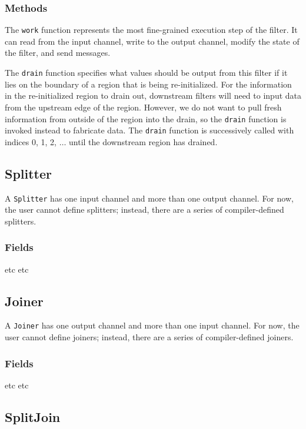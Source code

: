 \subsubsection{Methods}

  The {\tt work} function represents the most
fine-grained execution step of the filter.  It can read from the input
channel, write to the output channel, modify the state of the filter,
and send messages.

  The {\tt drain} function
specifies what values should be output from this filter if it lies on
the boundary of a region that is being re-initialized.  For the
information in the re-initialized region to drain out, downstream
filters will need to input data from the upstream edge of the region.
However, we do not want to pull fresh information from outside of the
region into the drain, so the {\tt drain} function is invoked instead
to fabricate data.  The {\tt drain} function is successively called
with indices 0, 1, 2, $\dots$ until the downstream region has drained.

\subsection{Splitter}

A {\tt Splitter} has one input channel and more than one output
channel.  For now, the user cannot define splitters; instead, there
are a series of compiler-defined splitters.

\subsubsection{Fields}

 etc etc

\subsection{Joiner}

A {\tt Joiner} has one output channel and more than one input channel.
For now, the user cannot define joiners; instead, there are a series
of compiler-defined joiners.

\subsubsection{Fields}

 etc etc

\subsection{SplitJoin}

